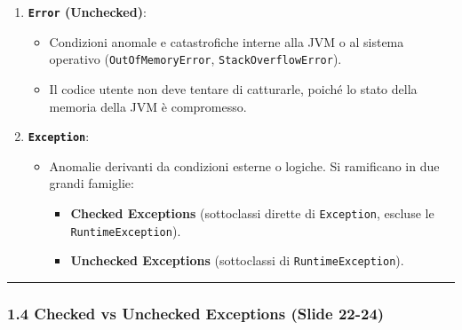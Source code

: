 \documentclass[11pt,a4paper]{article}
\newcommand{\passthrough}[1]{#1}
\providecommand{\tightlist}{\setlength{\itemsep}{0pt}\setlength{\parskip}{0pt}}
\begin{document}
\begin{enumerate}
\def\labelenumi{\arabic{enumi}.}
\tightlist
\item
  \textbf{\passthrough{\lstinline!Error!} (Unchecked)}:

  \begin{itemize}
  \tightlist
  \item
    Condizioni anomale e catastrofiche interne alla JVM o al sistema
    operativo (\passthrough{\lstinline!OutOfMemoryError!},
    \passthrough{\lstinline!StackOverflowError!}).
  \item
    Il codice utente non deve tentare di catturarle, poiché lo stato
    della memoria della JVM è compromesso.
  \end{itemize}
\item
  \textbf{\passthrough{\lstinline!Exception!}}:

  \begin{itemize}
  \tightlist
  \item
    Anomalie derivanti da condizioni esterne o logiche. Si ramificano in
    due grandi famiglie:

    \begin{itemize}
    \tightlist
    \item
      \textbf{Checked Exceptions} (sottoclassi dirette di
      \passthrough{\lstinline!Exception!}, escluse le
      \passthrough{\lstinline!RuntimeException!}).
    \item
      \textbf{Unchecked Exceptions} (sottoclassi di
      \passthrough{\lstinline!RuntimeException!}).
    \end{itemize}
  \end{itemize}
\end{enumerate}

\begin{center}\rule{0.5\linewidth}{0.5pt}\end{center}

\subsubsection{1.4 Checked vs Unchecked Exceptions (Slide
22-24)}\label{checked-vs-unchecked-exceptions-slide-22-24}
\end{document}
